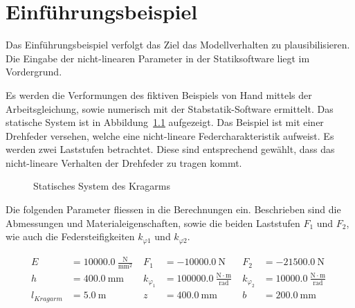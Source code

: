 \documentclass[
  11pt,
  letterpaper,
]{scrreprt}
\begin{document}

\chapter{Einführungsbeispiel}\label{einfuxfchrungsbeispiel}

Das Einführungsbeispiel verfolgt das Ziel das Modellverhalten zu
plausibilisieren. Die Eingabe der nicht-linearen Parameter in der
Statiksoftware liegt im Vordergrund.

Es werden die Verformungen des fiktiven Beispiels von Hand mittels der
Arbeitsgleichung, sowie numerisch mit der Stabstatik-Software ermittelt.
Das statische System ist in Abbildung~\ref{fig-kragarm-feder}
aufgezeigt. Das Beispiel ist mit einer Drehfeder versehen, welche eine
nicht-lineare Federcharakteristik aufweist. Es werden zwei Laststufen
betrachtet. Diese sind entsprechend gewählt, dass das nicht-lineare
Verhalten der Drehfeder zu tragen kommt.

\begin{figure}[H]


\caption{\label{fig-kragarm-feder}Statisches System des Kragarms}

\end{figure}%

Die folgenden Parameter fliessen in die Berechnungen ein. Beschrieben
sind die Abmessungen und Materialeigenschaften, sowie die beiden
Laststufen \(F_1\) und \(F_2\), wie auch die Federsteifigkeiten
\(k_{\varphi1}\) und \(k_{\varphi2}\).

$$
\begin{aligned}
E &= 10000.0\ \frac{\mathrm{N}}{\mathrm{mm}^{2}} \; 
 &F_{1} &= -10000.0\ \mathrm{N} \; 
 &F_{2} &= -21500.0\ \mathrm{N} \; 
\\[12pt]
 h &= 400.0\ \mathrm{mm} \; 
 &k_{\varphi_{1}} &= 100000.0\ \frac{\mathrm{N} \cdot \mathrm{m}}{\mathrm{rad}} \; 
 &k_{\varphi_{2}} &= 10000.0\ \frac{\mathrm{N} \cdot \mathrm{m}}{\mathrm{rad}} \; 
\\[12pt]
 l_{Kragarm} &= 5.0\ \mathrm{m} \; 
 &z &= 400.0\ \mathrm{mm} \; 
 &b &= 200.0\ \mathrm{mm} \; 
\\[12pt]
\end{aligned}
$$
\end{document}
